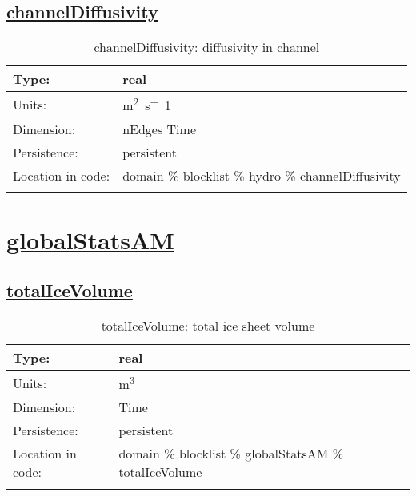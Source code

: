 \subsection[channelDiffusivity]{\hyperref[sec:var_tab_hydro]{channelDiffusivity}}
\label{subsec:var_sec_hydro_channelDiffusivity}
\begin{center}
\begin{longtable}{| p{2.0in} | p{4.0in} |}
        \hline 
        Type: & real \\
        \hline 
        Units: & \si{m^2.s^-1} \\
        \hline 
        Dimension: & nEdges Time \\
        \hline 
        Persistence: & persistent \\
        \hline 
         Location in code: & domain \% blocklist \% hydro \% channelDiffusivity \\
         \hline 
    \caption{channelDiffusivity: diffusivity in channel}
\end{longtable}
\end{center}
\section[globalStatsAM]{\hyperref[sec:var_tab_globalStatsAM]{globalStatsAM}}
\label{sec:var_sec_globalStatsAM}
\subsection[totalIceVolume]{\hyperref[sec:var_tab_globalStatsAM]{totalIceVolume}}
\label{subsec:var_sec_globalStatsAM_totalIceVolume}
\begin{center}
\begin{longtable}{| p{2.0in} | p{4.0in} |}
        \hline 
        Type: & real \\
        \hline 
        Units: & \si{m^3} \\
        \hline 
        Dimension: & Time \\
        \hline 
        Persistence: & persistent \\
        \hline 
         Location in code: & domain \% blocklist \% globalStatsAM \% totalIceVolume \\
         \hline 
    \caption{totalIceVolume: total ice sheet volume}
\end{longtable}
\end{center}
